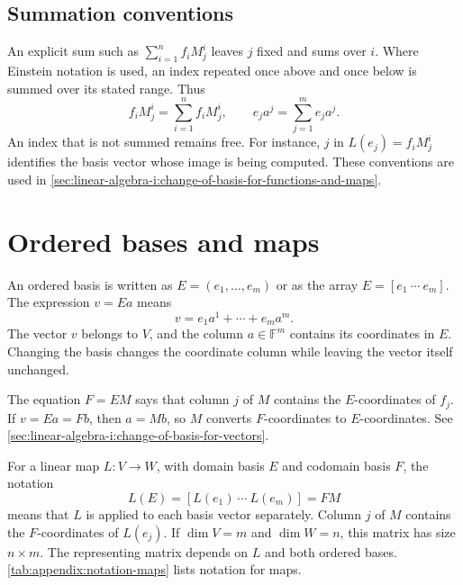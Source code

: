\subsection{Summation conventions}

An explicit sum such as \(\sum_{i=1}^n f_iM^i_j\) leaves \(j\) fixed
and sums over \(i\). Where Einstein notation is used, an index repeated
once above and once below is summed over its stated range. Thus
\[
  f_iM^i_j=\sum_{i=1}^n f_iM^i_j,
  \qquad
  e_ja^j=\sum_{j=1}^m e_ja^j.
\]
An index that is not summed remains free. For instance, \(j\) in
\(L(e_j)=f_iM^i_j\) identifies the basis vector whose image is being
computed. These conventions are used in
\autoref{sec:linear-algebra-i:change-of-basis-for-functions-and-maps}.

\section{Ordered bases and maps}
\label{sec:appendix:notation-bases-and-maps}

An ordered basis is written as \(E=(e_1,\ldots,e_m)\) or as the array
\(E=[e_1\ \cdots\ e_m]\). The expression \(v=Ea\) means
\[
  v=e_1a^1+\cdots+e_ma^m.
\]
The vector \(v\) belongs to \(V\), and the column \(a\in\mathbb F^m\)
contains its coordinates in \(E\). Changing the basis changes the
coordinate column while leaving the vector itself unchanged.

The equation \(F=EM\) says that column \(j\) of \(M\) contains the
\(E\)-coordinates of \(f_j\). If \(v=Ea=Fb\), then \(a=Mb\), so
\(M\) converts \(F\)-coordinates to \(E\)-coordinates. See
\autoref{sec:linear-algebra-i:change-of-basis-for-vectors}.

For a linear map \(L:V\to W\), with domain basis \(E\) and codomain
basis \(F\), the notation
\[
  L(E)=[L(e_1)\ \cdots\ L(e_m)]=FM
\]
means that \(L\) is applied to each basis vector separately. Column
\(j\) of \(M\) contains the \(F\)-coordinates of \(L(e_j)\).
If \(\dim V=m\) and \(\dim W=n\), this matrix has size \(n\times m\).
The representing matrix depends on \(L\) and both ordered bases.
\autoref{tab:appendix:notation-maps} lists notation for maps.

